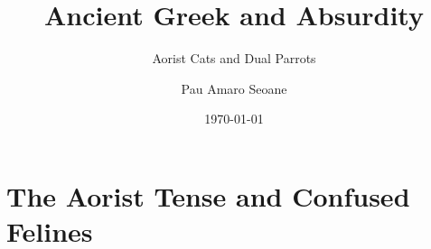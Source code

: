 \documentclass[10pt, compress]{beamer}
\title{Ancient Greek and Absurdity}
\subtitle{Aorist Cats and Dual Parrots}
\author{Pau Amaro Seoane}
\date{\today}
\begin{document}
\maketitle

\section{The Aorist Tense and Confused Felines}
\end{document}

